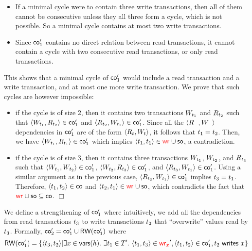 \begin{itemize}
  \item If a minimal cycle were to contain three write transactions, then all of them cannot be consecutive unless they all three form a cycle, which is not possible. So a minimal cycle contains at most two write transactions.
  \item Since $\mathsf{co}'_1$ contains no direct relation between read transactions, it cannot contain a cycle with two consecutive read transactions, or only read transactions.
 \end{itemize}
This shows that a minimal cycle of $\mathsf{co}'_1$ would include a read transaction and a write transaction, and at most one more write transaction. We prove that such cycles are however impossible:
 \begin{itemize}
  \item if the cycle is of size 2, then it contains two transactions $W_{{t}_1}$ and $R_{{t}_2}$ such that ${\left\langle{W_{{t}_1}, R_{{t}_2}}\right\rangle}\in\mathsf{co}'_1$ and ${\left\langle{R_{{t}_2}, W_{{t}_1}}\right\rangle}\in \mathsf{co}'_1$. Since all the ${\left\langle{R_{\_}, W_{\_}}\right\rangle}$ dependencies in $\mathsf{co}'_1$ are of the form ${\left\langle{R_{t}, W_{t}}\right\rangle}$, it follows that ${t}_1 = {t}_2$. Then, we have ${\left\langle{W_{{t}_1}, R_{{t}_1}}\right\rangle} \in \mathsf{co}'_1$ which implies ${\left\langle{{t}_1, {t}_1}\right\rangle} \in \textcolor{red}{\mathsf{wr}_{}} \cup \mathsf{so}$, a contradiction.
  \item if the cycle is of size 3, then it contains three transactions $W_{{t}_1}$, $W_{{t}_2}$, and $R_{{t}_3}$ such that ${\left\langle{W_{{t}_1}, W_{{t}_2}}\right\rangle}\in \mathsf{co}'_1$,  ${\left\langle{W_{{t}_2}, R_{{t}_3}}\right\rangle}\in \mathsf{co}'_1$, and ${\left\langle{R_{{t}_3}, W_{{t}_1}}\right\rangle} \in \mathsf{co}'_1$. Using a similar argument as in the previous case, ${\left\langle{R_{{t}_3}, W_{{t}_1}}\right\rangle} \in \mathsf{co}'_1$ implies ${t}_3 = {t}_1$. Therefore, ${\left\langle{{t}_1, {t}_2}\right\rangle} \in \mathsf{co}$ and ${\left\langle{{t}_2, {t}_1}\right\rangle} \in \textcolor{red}{\mathsf{wr}_{}} \cup \mathsf{so}$, which contradicts the fact that $\textcolor{red}{\mathsf{wr}_{}} \cup \mathsf{so}\subseteq \mathsf{co}$. \hfill $\Box$
 \end{itemize}

 
 We define a strengthening of $\mathsf{co}'_1$ where intuitively, we add all the dependencies from read transactions ${t}_3$ to write transactions ${t}_2$ that ``overwrite'' values read by ${t}_3$. Formally, $\mathsf{co}'_2= \mathsf{co}'_1\cup\mathsf{RW}(\mathsf{co}'_1)$ where 
 \begin{align*}
  \rwo(\co'_1) = \{\tup{\tr_3, \tr_2}| \exists \xvar \in \vars{h}.\ \exists \tr_1\in T'.\ \tup{\tr_1,\tr_3} \in \wro[\xvar]', \tup{\tr_1, \tr_2} \in \co'_1, \writeVar{\tr_2}{\xvar} \} 
 \end{align*}
 

